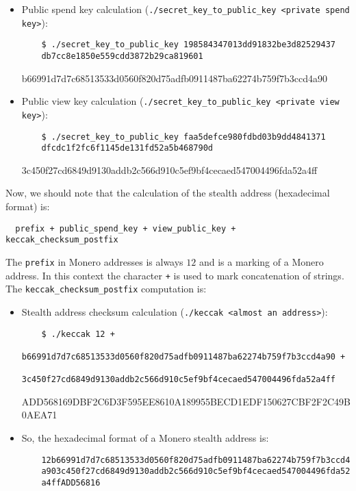 \begin{itemize}
\begin{tcolorbox}[colback=green!5!white,colframe=green!65!black,title=Output:]
  \end{tcolorbox}
  \item Public spend key calculation (\verb|./secret_key_to_public_key <private spend key>|):
  \begin{verbatim}
    $ ./secret_key_to_public_key 198584347013dd91832be3d82529437
    db7cc8e1850e559cdd3872b29ca819601
  \end{verbatim}
  \begin{tcolorbox}[colback=green!5!white,colframe=green!65!black,title=Output:]
    \small{b66991d7d7c68513533d0560f820d75adfb0911487ba62274b759f7b3ccd4a90}
  \end{tcolorbox}
  \item Public view key calculation (\verb|./secret_key_to_public_key <private view key>|):
  \begin{verbatim}
    $ ./secret_key_to_public_key faa5defce980fdbd03b9dd4841371
    dfcdc1f2fc6f1145de131fd52a5b468790d
  \end{verbatim}
  \begin{tcolorbox}[colback=green!5!white,colframe=green!65!black,title=Output:]
    \small{3c450f27cd6849d9130addb2c566d910c5ef9bf4cecaed547004496fda52a4ff}
  \end{tcolorbox}
\end{itemize}

Now, we should note that the calculation of the stealth address (hexadecimal format) is:
\begin{verbatim}
  prefix + public_spend_key + view_public_key + keccak_checksum_postfix
\end{verbatim}
The \verb|prefix| in Monero addresses is always $12$ and is a marking of a Monero address. In this context the character \verb|+| is used to mark concatenation of strings. The \verb|keccak_checksum_postfix| computation is:
\begin{itemize}
  \item Stealth address checksum calculation (\verb|./keccak <almost an address>|):
  \begin{verbatim}
    $ ./keccak 12 +
    b66991d7d7c68513533d0560f820d75adfb0911487ba62274b759f7b3ccd4a90 +
    3c450f27cd6849d9130addb2c566d910c5ef9bf4cecaed547004496fda52a4ff
  \end{verbatim}
  \begin{tcolorbox}[colback=green!5!white,colframe=green!65!black,title=Output:]
    \footnotesize{ADD568169DBF2C6D3F595EE8610A189955BECD1EDF150627CBF2F2C49B0AEA71}
  \end{tcolorbox}
  \item So, the hexadecimal format of a Monero stealth address is:
  \begin{verbatim}
    12b66991d7d7c68513533d0560f820d75adfb0911487ba62274b759f7b3ccd4
    a903c450f27cd6849d9130addb2c566d910c5ef9bf4cecaed547004496fda52
    a4ffADD56816
  \end{verbatim}
\end{itemize}

